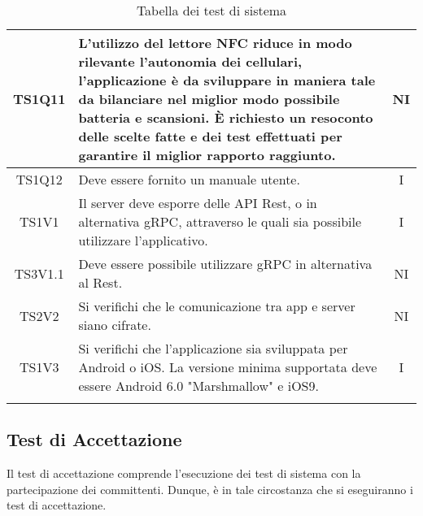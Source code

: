 \begin{center}
\begin{longtable}{|c|p{10cm}|c|}
			\hline
			TS1Q11 & L’utilizzo del lettore NFC riduce in modo rilevante l’autonomia dei cellulari, l’applicazione è da sviluppare in maniera tale da bilanciare nel miglior modo possibile batteria e scansioni. È richiesto un resoconto delle scelte fatte e dei test effettuati per garantire il miglior rapporto raggiunto. & NI \\	
			\hline
			TS1Q12 & Deve essere fornito un manuale utente. & I \\	
			\hline
			TS1V1 & Il server deve esporre delle API Rest, o in alternativa gRPC, attraverso le quali sia possibile utilizzare l'applicativo. & I \\	
			\hline
			TS3V1.1 & Deve essere possibile utilizzare gRPC in alternativa al Rest. & NI \\	
			\hline
			TS2V2 & Si verifichi che le comunicazione tra app e server siano cifrate. & NI \\	
			\hline
			TS1V3 & Si verifichi che l'applicazione sia sviluppata per Android o iOS. La versione minima supportata deve essere  Android 6.0 "Marshmallow" e iOS9. & I \\	
			\hline
			\hiderowcolors
			\caption{Tabella dei test di sistema}		
		\end{longtable}	
	\end{center}

	\subsection{Test di Accettazione}
	Il test di accettazione comprende l'esecuzione dei test di sistema con la partecipazione dei committenti. Dunque, è in tale circostanza che si eseguiranno i test di accettazione. 
